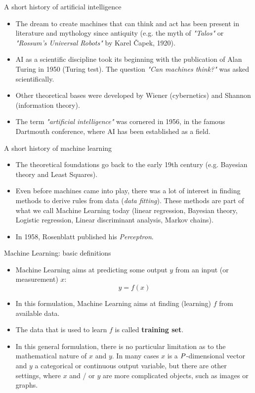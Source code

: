 \documentclass[xcolor=pdftex,dvipsnames,table]{beamer}
\begin{document}
\begin{frame}{A short history of artificial intelligence}
\begin{itemize}
	\item The dream to create machines that can think and act has been present in literature and mythology since antiquity (e.g. the myth of \emph{"Talos"} or \emph{"Rossum's Universal Robots"} by Karel \v{C}apek, 1920).
	\item AI as a scientific discipline took its beginning with the publication of Alan Turing in 1950 (Turing test). The question \emph{"Can machines think?"} was asked scientifically.
	\item Other theoretical bases were developed by Wiener (cybernetics) and Shannon (information theory). 
	\item The term \emph{"artificial intelligence"} was cornered in 1956, in the famous Dartmouth conference, where AI has been established as a field.
\end{itemize}
\end{frame}

\begin{frame}{A short history of machine learning}
\begin{itemize}
	\item The theoretical foundations go back to the early 19th century (e.g. Bayesian theory and Least Squares). 
	\item Even before machines came into play, there was a lot of interest in finding methods to derive rules from data (\emph{data fitting}). These methods are part of what we call Machine Learning today (linear regression, Bayesian theory, Logistic regression, Linear discriminant analysis, Markov chains). 
	\item In 1958, Rosenblatt published his \emph{Perceptron}. 
\end{itemize}
\end{frame}

\begin{frame}{Machine Learning: basic definitions}
\begin{itemize}
	\item Machine Learning aims at predicting some output $y$ from an input (or measurement) $x$:
	\begin{equation}
	y = f(x)
	\end{equation}
	\item In this formulation, Machine Learning aims at finding (learning) $f$ from available data. 
	\item The data that is used to learn $f$ is called \textbf{training set}. 
	\item In this general formulation, there is no particular limitation as to the mathematical nature of $x$ and $y$. In many cases $x$ is a $P$-dimensional vector and $y$ a categorical or continuous output variable, but there are other settings, where $x$ and / or $y$ are more complicated objects, such as images or graphs.
\end{itemize}
\end{frame}
\end{document}
